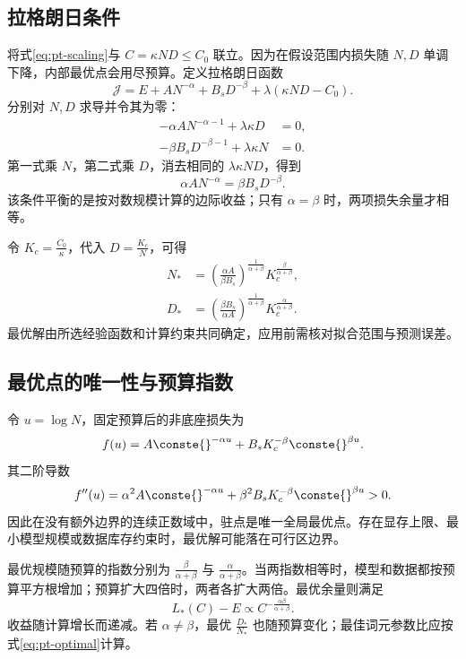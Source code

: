 \documentclass[../textbook.tex]{subfiles}
\begin{document}
\subsection{拉格朗日条件}
将式\eqref{eq:pt-scaling}与 $C=\kappa ND\le C_0$ 联立。因为在假设范围内损失随 $N,D$ 单调下降，内部最优点会用尽预算。定义拉格朗日函数
\begin{equation}
 \mathcal J=E+AN^{-\alpha}+B_sD^{-\beta}
 +\lambda(\kappa ND-C_0).
\end{equation}
分别对 $N,D$ 求导并令其为零：
\begin{align}
 -\alpha AN^{-\alpha-1}+\lambda\kappa D&=0,\\
 -\beta B_sD^{-\beta-1}+\lambda\kappa N&=0.
\end{align}
第一式乘 $N$，第二式乘 $D$，消去相同的 $\lambda\kappa ND$，得到
\begin{equation}
 \alpha AN^{-\alpha}=\beta B_sD^{-\beta}.
 \label{eq:pt-balance}
\end{equation}
该条件平衡的是按对数规模计算的边际收益；只有 $\alpha=\beta$ 时，两项损失余量才相等。

令 $K_c=\frac{C_0}{\kappa}$，代入 $D=\frac{K_c}{N}$，可得
\begin{align}
 N_*&=\left(\frac{\alpha A}{\beta B_s}\right)^{\frac{1}{\alpha+\beta}}
 K_c^{\frac{\beta}{\alpha+\beta}},\\
 D_*&=\left(\frac{\beta B_s}{\alpha A}\right)^{\frac{1}{\alpha+\beta}}
 K_c^{\frac{\alpha}{\alpha+\beta}}.
 \label{eq:pt-optimal}
\end{align}
最优解由所选经验函数和计算约束共同确定，应用前需核对拟合范围与预测误差。

\subsection{最优点的唯一性与预算指数}
令 $u=\log N$，固定预算后的非底座损失为
\begin{equation}
 f(u)=A\conste{}^{-\alpha u}+B_sK_c^{-\beta}\conste{}^{\beta u}.
\end{equation}
其二阶导数
\begin{equation}
 f''(u)=\alpha^2A\conste{}^{-\alpha u}+\beta^2B_sK_c^{-\beta}\conste{}^{\beta u}>0.
\end{equation}
因此在没有额外边界的连续正数域中，驻点是唯一全局最优点。存在显存上限、最小模型规模或数据库存约束时，最优解可能落在可行区边界。

最优规模随预算的指数分别为 $\frac{\beta}{\alpha+\beta}$ 与 $\frac{\alpha}{\alpha+\beta}$。当两指数相等时，模型和数据都按预算平方根增加；预算扩大四倍时，两者各扩大两倍。最优余量则满足
\begin{equation}
 L_*(C)-E\propto C^{-\frac{\alpha\beta}{\alpha+\beta}}.
\end{equation}
收益随计算增长而递减。若 $\alpha\ne\beta$，最优 $\frac{D_*}{N_*}$ 也随预算变化；最佳词元参数比应按式\eqref{eq:pt-optimal}计算。
\end{document}
